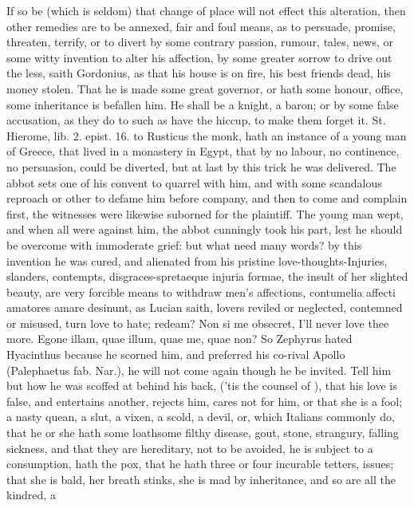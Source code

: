 If so be (which is seldom) that change of place will not effect this
alteration, then other remedies are to be annexed, fair and foul means,
as to persuade, promise, threaten, terrify, or to divert by some
contrary passion, rumour, tales, news, or some witty invention to alter
his affection, by some greater sorrow to drive out the less,
saith Gordonius, as that his house is on fire, his best friends dead,
his money stolen. That he is made some great governor, or hath
some honour, office, some inheritance is befallen him. He shall be a
knight, a baron; or by some false accusation, as they do to such as
have the hiccup, to make them forget it. St. Hierome, lib. 2. epist.
16. to Rusticus the monk, hath an instance of a young man of Greece,
that lived in a monastery in Egypt, that by no labour, no
continence, no persuasion, could be diverted, but at last by this trick
he was delivered. The abbot sets one of his convent to quarrel with
him, and with some scandalous reproach or other to defame him before
company, and then to come and complain first, the witnesses were
likewise suborned for the plaintiff. The young man wept, and when all
were against him, the abbot cunningly took his part, lest he should be
overcome with immoderate grief: but what need many words? by this
invention he was cured, and alienated from his pristine
love-thoughts-Injuries, slanders, contempts, disgraces-spretaeque
injuria formae, the insult of her slighted beauty, are very forcible
means to withdraw men's affections, contumelia affecti amatores amare
desinunt, as Lucian saith, lovers reviled or neglected, contemned
or misused, turn love to hate; redeam? Non si me obsecret, I'll
never love thee more. Egone illam, quae illum, quae me, quae non? So
Zephyrus hated Hyacinthus because he scorned him, and preferred his
co-rival Apollo (Palephaetus fab. Nar.), he will not come again though
he be invited. Tell him but how he was scoffed at behind his back,
('tis the counsel of \Avicenna{}), that his love is false, and entertains
another, rejects him, cares not for him, or that she is a fool; a nasty
quean, a slut, a vixen, a scold, a devil, or, which Italians commonly
do, that he or she hath some loathsome filthy disease, gout, stone,
strangury, falling sickness, and that they are hereditary, not to be
avoided, he is subject to a consumption, hath the pox, that he hath
three or four incurable tetters, issues; that she is bald, her breath
stinks, she is mad by inheritance, and so are all the kindred, a

